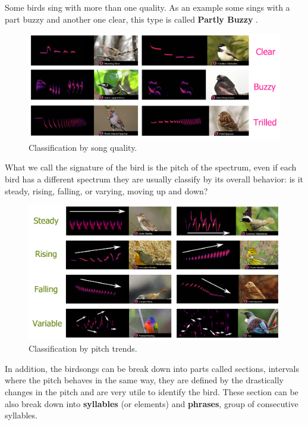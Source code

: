 Some birds sing with more than one quality. As an example some sings with a part buzzy and another one clear, this type is called \textbf{Partly Buzzy} .

\begin{figure}[H]
    \centering
    \includegraphics[scale=1.2]{Images/quality.png}
    \caption{Classification by song quality. }
    \label{fig:quality}
\end{figure}

What we call the signature of the bird is the pitch of the spectrum, even if each bird has a different spectrum they are usually classify by its overall behavior: is it steady, rising, falling, or varying, moving up and down? 

\begin{figure}[H]
    \centering
    \includegraphics[scale=1.2]{Images/pitch_trend.png}
    \caption{Classification by pitch trends.}
    \label{fig:quality}
\end{figure}

In addition, the birdsongs can be break down into parts called sections, intervals where the pitch behaves in the same way, they are defined by the drastically changes in the pitch and are very utile to identify the bird. These section can be also break down into \textbf{syllables} (or elements) and \textbf{phrases}, group of consecutive syllables. 


